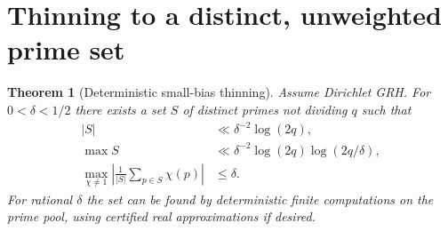 \documentclass[11pt]{article}
\newtheorem{theorem}{Theorem}[section]
\theoremstyle{remark}\newtheorem{remark}[theorem]{Remark}
\begin{document}
\section{Thinning to a distinct, unweighted prime set}\label{sec:thin}
\begin{theorem}[Deterministic small-bias thinning]\label{thm:thin}
Assume Dirichlet GRH. For $0<\delta<1/2$ there exists a set $S$ of distinct primes not dividing $q$ such that
\begin{align*}
 |S|&\ll\delta^{-2}\log(2q),\\
 \max S&\ll\delta^{-2}\log(2q)\log(2q/\delta),\\
 \max_{\chi\ne1}\left|\frac{1}{|S|}\sum_{p\in S}\chi(p)\right|&\le\delta.
\end{align*}
For rational $\delta$ the set can be found by deterministic finite computations on the prime pool, using certified real approximations if desired.
\end{theorem}
\end{document}
